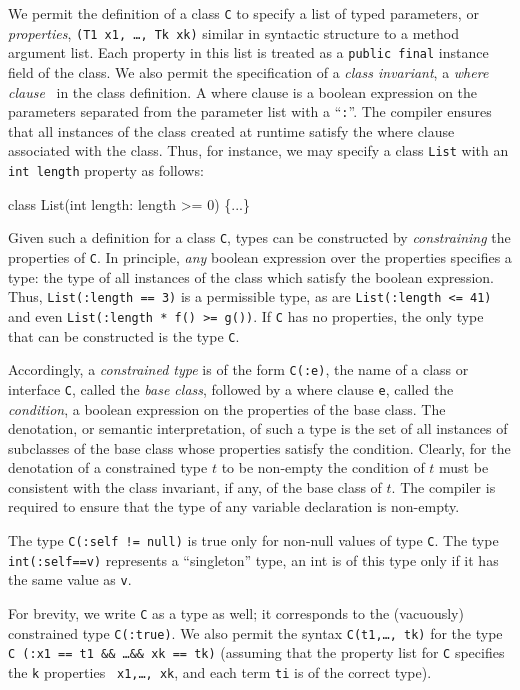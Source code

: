 We permit the definition of a class {\tt C} to specify
a list of typed parameters, or {\em properties},
{\tt (T1 x1, \ldots, Tk xk)} similar in syntactic structure to
a method argument list. Each
property in this list is treated as a {\tt public final} instance
field of the class.
We also permit the
specification of a {\em class invariant}, a
{\em where clause}~\cite{where-clauses}
in the class definition. A where
clause is a boolean expression on the parameters separated from the
parameter list with a ``{\tt :}''.  The compiler ensures that all
instances of the class created at runtime satisfy the where clause
associated with the class.
Thus, for instance, we may specify a class {\tt List} with an
{\tt int length} property as follows:
\begin{code}
  class List(int length: length >= 0) \{...\}
\end{code}

Given such a definition for a class {\tt C},
types can be constructed by {\em constraining} the properties of
{\tt C}.
In principle, {\em any} boolean expression over the
properties specifies a type: the type of all instances of the
class which satisfy the boolean expression. Thus,
{\tt List(:length == 3)} is a permissible type, as are
{\tt List(:length <= 41)} and even
{\tt List(:length * f() >= g())}.
If {\tt C} has no properties, the only type that can be
constructed is the type {\tt C}.

Accordingly, a {\em constrained type} is of the form {\tt C(:e)}, the name of
a class or interface {\tt C}, called the {\em base class}, followed by a
where clause {\tt e}, called the {\em condition}, a boolean expression
on the properties of the base class. 
The denotation, or
semantic interpretation, of such a type is the set of all instances
of subclasses of the base class whose properties satisfy the
condition.
Clearly, for the denotation of a constrained type $t$ to be
non-empty the condition of $t$ must be consistent with the class
invariant, if any, of the base class of $t$.  The compiler is required to
ensure that the type of any variable declaration is non-empty.

\begin{example}	
The type {\tt C(:self != null)} is true only for non-null values of
type {\tt C}. The type {\tt int(:self==v)} represents a ``singleton''
type, an int is of this type only if it has the same value as {\tt v}.
\end{example}

For brevity, we write {\tt C} as a type as well; it
corresponds to the (vacuously) constrained type {\tt C(:true)}.
We also permit the syntax {\tt C(t1,\ldots, tk)} for
the type {\tt C (:x1 == t1 \&\& \ldots \&\& xk == tk)} (assuming that
the property list for {\tt C} specifies the {\tt k} properties {\tt
x1,\ldots, xk}, and each term {\tt ti} is of the correct
type). 

